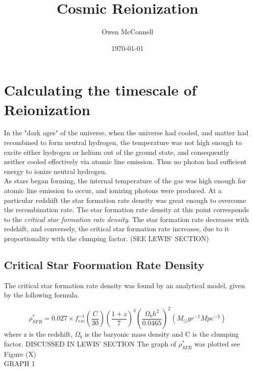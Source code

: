 \documentclass[pdf,color]{UoBnote}
\author{Owen McConnell}
\title{Cosmic Reionization}
\date{\today}
\begin{document}







\section{Calculating the timescale of Reionization}
In the "dark ages" of the universe, when the universe had cooled, and matter had recombined to form neutral hydrogen, the temperature was not high enough to excite either hydrogen or helium out of the ground state, and consequently neither cooled effectively via atomic line emission. Thus no photon had sufficient energy to ionize neutral hydrogen. \\
\newline
As stars began forming, the internal temperature of the gas was high enough for atomic line emission to occur, and ionizing photons were produced. At a particular redshift the star formation rate density was great enough to overcome the recombination rate. The star formation rate density at this point corresponds to the \emph{critical star formation rate density}. The star formation rate decreases with redshift, and conversely, the critical star formation rate increases, due to it proportionality with the clumping factor. (SEE LEWIS' SECTION)












\subsection{Critical Star Foormation Rate Density}
The critical star formation rate density was found by an analytical model, given by the following formula. \cite{Pawlik:2009ij}

\begin{equation}
\rho^*_{SFR} = 0.027 \times f^{-1}_{esc} \left (\frac{C}{30} \right ) \left (\frac{1+z}{7} \right )^3 \left (\frac{\Omega_b h^2}{0.0465} \right )^2 (M_\odot yr^{-1} Mpc^{-3})
\end{equation}
where z is the redshift, $\Omega_b$ is the baryonic mass density and C is the clumping factor. DISCUSSED IN LEWIS' SECTION The graph of $\rho^*_{SFR}$ was plotted see Figure (X)\\
\newline
GRAPH 1
\end{document}
